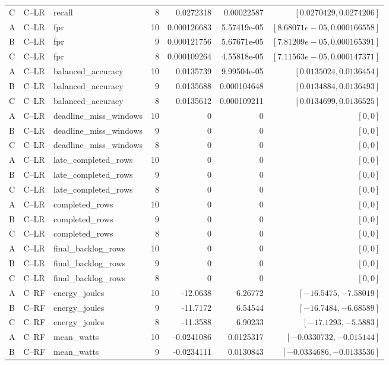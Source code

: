 \begin{longtable}{lllrrrr}
C & C--LR & recall & 8 & 0.0272318 & 0.00022587 & $[0.0270429,0.0274206]$\\
A & C--LR & fpr & 10 & 0.000126683 & 5.57419e-05 & $[8.68071e-05,0.000166558]$\\
B & C--LR & fpr & 9 & 0.000121756 & 5.67671e-05 & $[7.81209e-05,0.000165391]$\\
C & C--LR & fpr & 8 & 0.000109264 & 4.55818e-05 & $[7.11563e-05,0.000147371]$\\
A & C--LR & balanced\_accuracy & 10 & 0.0135739 & 9.99504e-05 & $[0.0135024,0.0136454]$\\
B & C--LR & balanced\_accuracy & 9 & 0.0135688 & 0.000104648 & $[0.0134884,0.0136493]$\\
C & C--LR & balanced\_accuracy & 8 & 0.0135612 & 0.000109211 & $[0.0134699,0.0136525]$\\
A & C--LR & deadline\_miss\_windows & 10 & 0 & 0 & $[0,0]$\\
B & C--LR & deadline\_miss\_windows & 9 & 0 & 0 & $[0,0]$\\
C & C--LR & deadline\_miss\_windows & 8 & 0 & 0 & $[0,0]$\\
A & C--LR & late\_completed\_rows & 10 & 0 & 0 & $[0,0]$\\
B & C--LR & late\_completed\_rows & 9 & 0 & 0 & $[0,0]$\\
C & C--LR & late\_completed\_rows & 8 & 0 & 0 & $[0,0]$\\
A & C--LR & completed\_rows & 10 & 0 & 0 & $[0,0]$\\
B & C--LR & completed\_rows & 9 & 0 & 0 & $[0,0]$\\
C & C--LR & completed\_rows & 8 & 0 & 0 & $[0,0]$\\
A & C--LR & final\_backlog\_rows & 10 & 0 & 0 & $[0,0]$\\
B & C--LR & final\_backlog\_rows & 9 & 0 & 0 & $[0,0]$\\
C & C--LR & final\_backlog\_rows & 8 & 0 & 0 & $[0,0]$\\
A & C--RF & energy\_joules & 10 & -12.0638 & 6.26772 & $[-16.5475,-7.58019]$\\
B & C--RF & energy\_joules & 9 & -11.7172 & 6.54544 & $[-16.7484,-6.68589]$\\
C & C--RF & energy\_joules & 8 & -11.3588 & 6.90233 & $[-17.1293,-5.5883]$\\
A & C--RF & mean\_watts & 10 & -0.0241086 & 0.0125317 & $[-0.0330732,-0.015144]$\\
B & C--RF & mean\_watts & 9 & -0.0234111 & 0.0130843 & $[-0.0334686,-0.0133536]$\\

\end{longtable}
